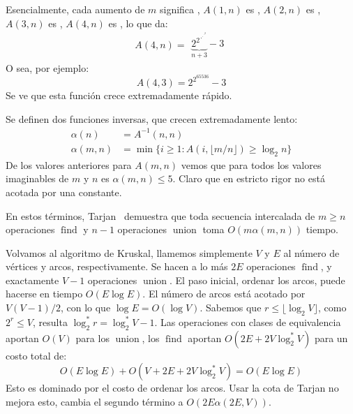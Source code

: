   Esencialmente,
  cada aumento de \(m\) significa
  ,
  \(A(1, n)\) es ,
  \(A(2, n)\) es ,
  \(A(3, n)\) es ,
  \(A(4, n)\) es ,
  lo que da:
  \begin{equation*}
    A(4, n)
      = \begin{matrix}
          \underbrace{{2^2}^{{\cdot}^{{\cdot}^{{\cdot}^2}}}}_{n + 3} - 3
        \end{matrix}
  \end{equation*}
  O sea,
  por ejemplo:
  \begin{equation*}
    A(4, 3)
      = 2^{2^{65536}} - 3
  \end{equation*}
  Se ve que esta función crece extremadamente rápido.

  Se definen dos funciones inversas,
  que crecen extremadamente lento:
  \begin{align}
    \alpha(n)
      &= A^{-1}(n, n)
            \label{eq:alpha-1} \\
    \alpha(m, n)
      &= \min \{ i \ge 1 \colon A(i, \lfloor m / n \rfloor) \ge \log_2 n \}
            \label{eq:alpha-2}
  \end{align}
  De los valores anteriores para \(A(m, n)\)
  vemos que para todos los valores imaginables de \(m\) y \(n\)
  es \(\alpha(m, n) \le 5\).
  Claro que en estricto rigor no está acotada por una constante.

  En estos términos,
  Tarjan~%
    \cite{tarjan75:_union-find_analysis}
  demuestra que
  toda secuencia intercalada
  de \(m \ge n\) operaciones \(\operatorname{find}\)
  y \(n - 1\) operaciones \(\operatorname{union}\)
  toma \(O(m \alpha(m, n))\) tiempo.

  Volvamos al algoritmo de Kruskal,
  llamemos simplemente \(V\) y \(E\) al número de vértices y arcos,
  respectivamente.
  Se hacen a lo más \(2 E\) operaciones \(\operatorname{find}\),
  y exactamente \(V - 1\) operaciones \(\operatorname{union}\).
  El paso inicial,
  ordenar los arcos,
  puede hacerse en tiempo \(O(E \log  E)\).
  El número de arcos está acotado por \(V (V - 1) / 2\),
  con lo que \(\log E = O(\log V)\).
  Sabemos que \(r \le \lfloor \log_2  V \rfloor\),
  como \(2^r \le V\),
  resulta \(\log_2^* r = \log_2^* V - 1\).
  Las operaciones con clases de equivalencia aportan
  \(O(V)\) para los \(\operatorname{union}\),
  los \(\operatorname{find}\) aportan
  \(O(2 E + 2 V \log_2^* V)\)
  para un costo total de:
  \begin{equation*}
    O(E \log E) + O(V + 2 E + 2 V \log_2^* V)
      = O(E \log E)
  \end{equation*}
  Esto es dominado por el costo de ordenar los arcos.
  Usar la cota de Tarjan no mejora esto,
  cambia el segundo término a \(O(2 E \alpha(2 E, V))\).

